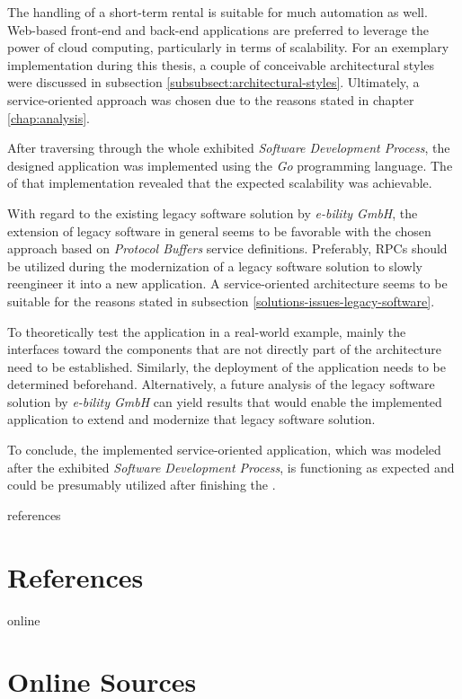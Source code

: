 \documentclass[12pt,a4paper,twoside]{report}
\begin{document}
The handling of a short-term rental is suitable for much automation as well.
Web-based front-end and back-end applications are preferred to leverage
the power of cloud computing, particularly in terms of scalability.
For an exemplary implementation during this thesis, a couple of conceivable
architectural styles were discussed in subsection \ref{subsubsect:architectural-styles}.
Ultimately, a service-oriented approach was chosen due to the reasons stated
in chapter \ref{chap:analysis}.

After traversing through the whole exhibited \textit{Software Development Process},
the designed application was implemented using the \textit{Go} programming language.
The \textit{} of that implementation revealed that
the expected scalability was achievable.

With regard to the existing legacy software solution by \textit{e-bility GmbH},
the extension of legacy software in general seems to be favorable with
the chosen approach based on \textit{Protocol Buffers} service definitions.
Preferably, RPCs should be utilized during the modernization of a
legacy software solution to slowly reengineer it into a new application.
A service-oriented architecture seems to be suitable for the reasons stated
in subsection \ref{solutions-issues-legacy-software}.

To theoretically test the application in a real-world example, mainly the
interfaces toward the components that are not directly part of the architecture
need to be established.
Similarly, the deployment of the application needs to be determined beforehand.
Alternatively, a future analysis of the legacy software solution by \textit{e-bility GmbH}
can yield results that would enable the implemented application to extend
and modernize that legacy software solution.

To conclude, the implemented service-oriented application, which was modeled
after the exhibited \textit{Software Development Process}, is functioning as expected
and could be presumably utilized after finishing the \textit{}.



\newpage

\listoffigures
\newpage

\begin{btSect}{references}
\section*{\huge{References}}
\btPrintCited
\end{btSect}
\begin{btSect}{online}
\section*{\huge{Online Sources}}
\btPrintCited
\end{btSect}
\end{document}

